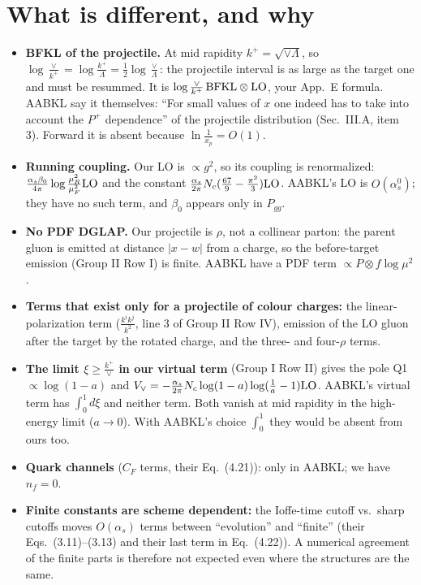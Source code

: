 \documentclass[10pt]{article}
\numberwithin{equation}{section}
\newcommand{\BB}{{\rm BFKL}\otimes{\rm LO}}
\begin{document}
\section{What is different, and why}\label{sec:new}
\begin{itemize}
\item \textbf{BFKL of the projectile.} At mid rapidity $k^+=\sqrt{\vee\Lambda}$, so $\log\frac{\vee}{k^+}=\log\frac{k^+}{\Lambda}=\frac12\log\frac{\vee}{\Lambda}$: the projectile interval is as large as the target one and must be resummed. It is $\log\frac{\vee}{k^+}\,\BB$, your App.~E formula. AABKL say it themselves: ``For small values of $x$ one indeed has to take into account the $P^+$ dependence'' of the projectile distribution (Sec.~III.A, item 3). Forward it is absent because $\ln\frac1{x_p}=O(1)$.
\item \textbf{Running coupling.} Our LO is $\propto g^2$, so its coupling is renormalized: $\frac{\alpha_s\beta_0}{4\pi}\log\frac{\mu_R^2}{\mu_F^2}{\rm LO}$ and the constant $\frac{\alpha_s}{2\pi}N_c(\frac{67}{9}-\frac{\pi^2}{3}){\rm LO}$. AABKL's LO is $O(\alpha_s^0)$; they have no such term, and $\beta_0$ appears only in $P_{gg}$.
\item \textbf{No PDF DGLAP.} Our projectile is $\rho$, not a collinear parton: the parent gluon is emitted at distance $|x-w|$ from a charge, so the before-target emission (Group II Row I) is finite. AABKL have a PDF term $\propto P\otimes f\log\mu^2$.
\item \textbf{Terms that exist only for a projectile of colour charges:} the linear-polarization term ($\frac{k^ik^j}{k^2}$, line 3 of Group II Row IV), emission of the LO gluon after the target by the rotated charge, and the three- and four-$\rho$ terms.
\item \textbf{The limit $\xi\ge\frac{k^+}{\vee}$ in our virtual term} (Group I Row II) gives the pole Q1 $\propto\log(1-a)$ and $V_\vee=-\frac{\alpha_s}{2\pi}N_c\log(1-a)\log(\frac1a-1){\rm LO}$. AABKL's virtual term has $\int_0^1d\xi$ and neither term. Both vanish at mid rapidity in the high-energy limit ($a\to0$). With AABKL's choice $\int_0^1$ they would be absent from ours too.
\item \textbf{Quark channels} ($C_F$ terms, their Eq.~(4.21)): only in AABKL; we have $n_f=0$.
\item \textbf{Finite constants are scheme dependent:} the Ioffe-time cutoff vs.\ sharp cutoffs moves $O(\alpha_s)$ terms between ``evolution'' and ``finite'' (their Eqs.~(3.11)--(3.13) and their last term in Eq.~(4.22)). A numerical agreement of the finite parts is therefore not expected even where the structures are the same.
\end{itemize}
\end{document}
